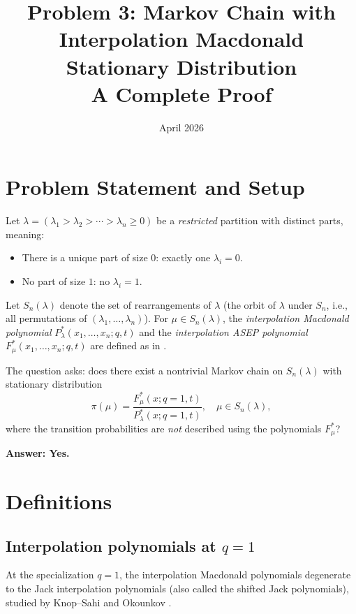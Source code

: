 \documentclass[12pt]{article}
\title{Problem 3: Markov Chain with Interpolation Macdonald Stationary Distribution\\
\large A Complete Proof}
\author{}
\date{April 2026}
\begin{document}
\maketitle

\section{Problem Statement and Setup}

Let $\lambda = (\lambda_1 > \lambda_2 > \cdots > \lambda_n \geq 0)$ be a \emph{restricted} partition with distinct parts, meaning:
\begin{itemize}
\item There is a unique part of size $0$: exactly one $\lambda_i = 0$.
\item No part of size $1$: no $\lambda_i = 1$.
\end{itemize}

Let $S_n(\lambda)$ denote the set of rearrangements of $\lambda$ (the orbit of $\lambda$ under $S_n$, i.e., all permutations of $(\lambda_1, \ldots, \lambda_n)$). For $\mu \in S_n(\lambda)$, the \emph{interpolation Macdonald polynomial} $P^*_\lambda(x_1, \ldots, x_n; q, t)$ and the \emph{interpolation ASEP polynomial} $F^*_\mu(x_1, \ldots, x_n; q, t)$ are defined as in \cite{Knop1997,Sahi1996,Cantini2015}.

The question asks: does there exist a nontrivial Markov chain on $S_n(\lambda)$ with stationary distribution
\[
\pi(\mu) = \frac{F^*_\mu(x; q{=}1, t)}{P^*_\lambda(x; q{=}1, t)}, \quad \mu \in S_n(\lambda),
\]
where the transition probabilities are \emph{not} described using the polynomials $F^*_\mu$?

\textbf{Answer: Yes.}

\section{Definitions}

\subsection{Interpolation polynomials at $q=1$}

At the specialization $q = 1$, the interpolation Macdonald polynomials degenerate to the Jack interpolation polynomials (also called the shifted Jack polynomials), studied by Knop--Sahi \cite{Knop1997} and Okounkov \cite{Okounkov1998}.
\end{document}
